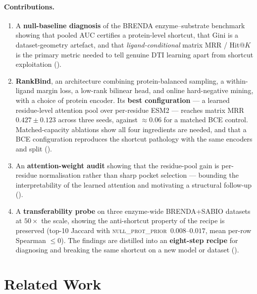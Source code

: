 \documentclass[11pt,a4paper]{article}
\newcommand{\method}{RankBind\xspace}
\newcommand{\nullprior}{\textsc{null\_prot\_prior}\xspace}
\begin{document}
\paragraph{Contributions.}
\begin{enumerate}[leftmargin=*,itemsep=0pt,topsep=2pt]
  \item A \textbf{null-baseline diagnosis} of the BRENDA enzyme--substrate
        benchmark showing that pooled AUC certifies a protein-level
        shortcut, that Gini is a dataset-geometry artefact, and that
        \emph{ligand-conditional} matrix MRR / Hit@$K$ is the primary
        metric needed to tell genuine DTI learning apart from shortcut
        exploitation ().
  \item \textbf{\method}, an architecture combining protein-balanced
        sampling, a within-ligand margin loss, a low-rank bilinear head,
        and online hard-negative mining, with a choice of protein encoder.
        Its \textbf{best configuration} --- a learned residue-level
        attention pool over per-residue ESM2 --- reaches matrix MRR
        $0.427 \pm 0.123$ across three seeds, against $\approx\!0.06$ for a
        matched BCE control. Matched-capacity ablations show all four
        ingredients are needed, and that a BCE configuration reproduces the
        shortcut pathology with the same encoders and split
        ().
  \item An \textbf{attention-weight audit} showing that the residue-pool
        gain is per-residue normalisation rather than sharp pocket
        selection --- bounding the interpretability of the learned
        attention and motivating a structural follow-up
        ().
  \item A \textbf{transferability probe} on three enzyme-wide
        BRENDA+SABIO datasets at $50\times$ the scale, showing the
        anti-shortcut property of the recipe is preserved (top-10
        Jaccard with \nullprior\ $0.008$--$0.017$, mean per-row
        Spearman $\le 0$). The findings are distilled into an
        \textbf{eight-step recipe} for diagnosing and breaking the
        same shortcut on a new model or dataset
        ().
\end{enumerate}

\section{Related Work}
\label{sec:related}
\end{document}
